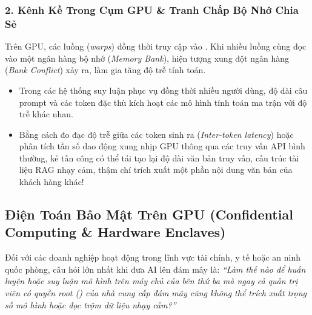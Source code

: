 \subsubsection{2. Kênh Kề Trong Cụm GPU \& Tranh Chấp Bộ Nhớ Chia Sẻ}
Trên GPU, các luồng (\textit{warps}) đồng thời truy cập vào . Khi nhiều luồng cùng đọc vào một ngân hàng bộ nhớ (\textit{Memory Bank}), hiện tượng xung đột ngân hàng (\textit{Bank Conflict}) xảy ra, làm gia tăng độ trễ tính toán.
\begin{itemize}
  \item Trong các hệ thống suy luận phục vụ đồng thời nhiều người dùng, độ dài câu prompt và các token đặc thù kích hoạt các mô hình tính toán ma trận với độ trễ khác nhau.
  \item Bằng cách đo đạc độ trễ giữa các token sinh ra (\textit{Inter-token latency}) hoặc phân tích tần số dao động xung nhịp GPU thông qua các truy vấn API bình thường, kẻ tấn công có thể tái tạo lại độ dài văn bản truy vấn, cấu trúc tài liệu RAG nhạy cảm, thậm chí trích xuất một phần nội dung văn bản của khách hàng khác!
\end{itemize}

\subsection{Điện Toán Bảo Mật Trên GPU (Confidential Computing \& Hardware Enclaves)}
\label{subsec:confidential-computing-gpu}
Đối với các doanh nghiệp hoạt động trong lĩnh vực tài chính, y tế hoặc an ninh quốc phòng, câu hỏi lớn nhất khi đưa AI lên đám mây là: \textit{``Làm thế nào để huấn luyện hoặc suy luận mô hình trên máy chủ của bên thứ ba mà ngay cả quản trị viên có quyền root () của nhà cung cấp đám mây cũng không thể trích xuất trọng số mô hình hoặc đọc trộm dữ liệu nhạy cảm?''}

